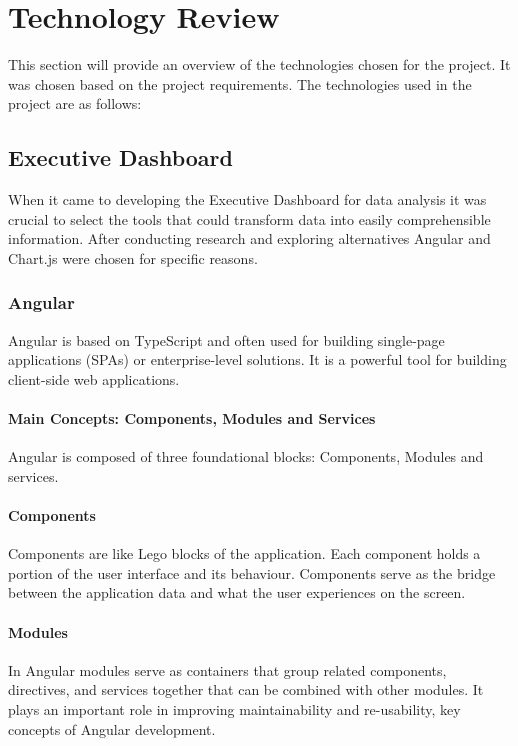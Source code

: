 \setlength{\headheight}{15pt}
\addtolength{\topmargin}{-2.5pt}

\chapter{Technology Review}

This section will provide an overview of the technologies chosen for the project. It was chosen based on the project requirements. 
The technologies used in the project are as follows:

\section{Executive Dashboard}
When it came to developing the Executive Dashboard for data analysis it was crucial to select the tools that could transform data into easily comprehensible information. After conducting research and exploring alternatives Angular and Chart.js were chosen for specific reasons.

\subsection{Angular}
Angular is based on TypeScript and often used for building single-page applications (SPAs) or enterprise-level solutions. It is a powerful tool for building
client-side web applications.

\subsubsection{Main Concepts: Components, Modules and Services}
Angular is composed of three foundational blocks: Components, Modules and services.

\subsubsection{Components} Components are like Lego blocks of the application. Each component holds a portion of the user interface and its behaviour. Components serve as the bridge between the application data and what the user experiences on the screen.\cite{angular-components}

\subsubsection{Modules} In Angular modules serve as containers that group related components, directives, and services together that can be combined with other modules. It plays an important role in improving maintainability and re-usability, key concepts of Angular development.\cite{angular-modules}

